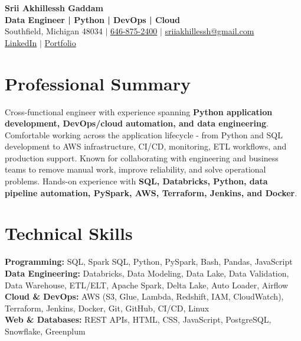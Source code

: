 \documentclass[letterpaper,10pt]{article}
\begin{document}
\fontsize{9.35pt}{10.45pt}\selectfont

\begin{center}
    {\LARGE \textbf{Srii Akhillessh Gaddam}} \\[-1pt]
    \textbf{Data Engineer | Python | DevOps | Cloud} \\[2pt]
    Southfield, Michigan 48034 $|$
    \href{tel:6468752400}{646-875-2400} $|$
    \href{mailto:sriiakhillessh@gmail.com}{sriiakhillessh@gmail.com} \\[1pt]
    \href{https://www.linkedin.com/in/srii-akhiilessh-gaddam-b48668191/}{LinkedIn} $|$
    \href{https://sriiakhillesshg.github.io/portfolio/}{Portfolio}
\end{center}
\vspace{-8pt}

\section{Professional Summary}
\small{Cross-functional engineer with experience spanning \textbf{Python application development, DevOps/cloud automation, and data engineering}. Comfortable working across the application lifecycle - from Python and SQL development to AWS infrastructure, CI/CD, monitoring, ETL workflows, and production support. Known for collaborating with engineering and business teams to remove manual work, improve reliability, and solve operational problems. Hands-on experience with \textbf{SQL, Databricks, Python, data pipeline automation, PySpark, AWS, Terraform, Jenkins, and Docker}.}

\section{Technical Skills}
\small{
\textbf{Programming:} SQL, Spark SQL, Python, PySpark, Bash, Pandas, JavaScript \\
\textbf{Data Engineering:} Databricks, Data Modeling, Data Lake, Data Validation, Data Warehouse, ETL/ELT, Apache Spark, Delta Lake, Auto Loader, Airflow \\
\textbf{Cloud \& DevOps:} AWS (S3, Glue, Lambda, Redshift, IAM, CloudWatch), Terraform, Jenkins, Docker, Git, GitHub, CI/CD, Linux \\
\textbf{Web \& Databases:} REST APIs, HTML, CSS, JavaScript, PostgreSQL, Snowflake, Greenplum
}
\end{document}
